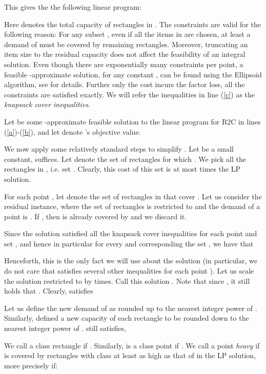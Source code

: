 \documentclass[11pt]{article}
\begin{document}
This gives the  the following linear program:

Here  denotes the total capacity of rectangles in .
The constraints are valid for the following reason: For any subset ,  even if all the items in  are chosen, at least a demand of  must be covered by remaining rectangles. 
Moreover, truncating an item size to the residual capacity does not affect the feasibility of an integral solution. Even though there are exponentially many constraints per point, 
a feasible -approximate solution, for any constant , can be found using the Ellipsoid algorithm, see
\cite{CarrFLP00} for details. Further 
only the cost incurs the  factor loss, 
all the constraints are satisfied exactly.
We will refer the inequalities in line (\ref{c}) 
as the {\em knapsack cover inequalities}.



Let  be some -approximate feasible solution to the linear
program for R2C in lines (\ref{a})-(\ref{b}), 
and let  denote 's objective value. 


We now apply some relatively standard steps to simplify .
Let  be  a small constant,  suffices. 
Let  denote the set of rectangles for which . 
We pick all the rectangles in , i.e. set . Clearly, this cost of this set is at most  times the LP solution.

For each point , let  denote the set of rectangles in  that cover . Let us consider the residual instance, where the set of rectangles is restricted to  
and the demand of a point is . If , then  is already covered by  and we discard it.

Since the solution  satisfied all the knapsack cover inequalities for each point  and set , and hence in particular 
for every  and corresponding the set , we have
that 

Henceforth, this is the only fact we will use about the solution  (in particular, we do not care that 
satisfies  several other inequalities for each point ).
Let us scale the solution  restricted to  by  times. Call this solution . Note that since , it still holds that   .  Clearly,  satisfies

Let us define the new demand  of  as 
 rounded up to the nearest integer power of .
Similarly, defined a new capacity  of 
each rectangle  to be  rounded down to the nearest integer power of .
 still satisfies,


We call  a class  rectangle if . Similarly,  is a class  point if .
We call a point  {\em heavy} if is covered by rectangles with class at least as high as that of  in the LP solution, more precisely
if:
\end{document}
